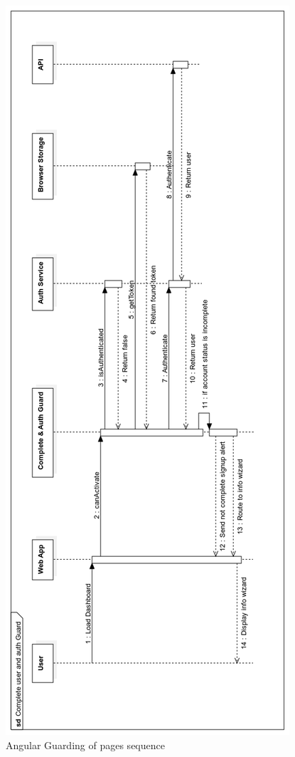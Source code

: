 \begin{figure}[H]
\caption{Angular Guarding of pages sequence}
\centering
\includegraphics[width=\textwidth,height=\textheight,keepaspectratio]{images/operational/Guard}
\end{figure}

